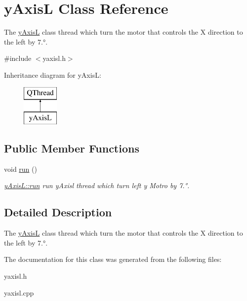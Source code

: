 \hypertarget{classy_axis_l}{}\section{y\+AxisL Class Reference}
\label{classy_axis_l}


The \mbox{\hyperlink{classy_axis_l}{y\+AxisL}} class thread which turn the motor that controls the X direction to the left by 7.°.  




{\ttfamily \#include $<$yaxisl.\+h$>$}

Inheritance diagram for y\+AxisL\+:\begin{figure}[H]
\begin{center}
\leavevmode
\includegraphics[height=2.000000cm]{classy_axis_l}
\end{center}
\end{figure}
\subsection*{Public Member Functions}
\begin{DoxyCompactItemize}
\item 
\mbox{\label{classy_axis_l_a9933821f630d3abc7614ec252b53d592}} 
void \mbox{\hyperlink{classy_axis_l_a9933821f630d3abc7614ec252b53d592}{run}} ()
\begin{DoxyCompactList}\small\item\em \mbox{\hyperlink{classy_axis_l_a9933821f630d3abc7614ec252b53d592}{y\+Axis\+L\+::run}} run y\+Axisl thread which turn left y Motro by 7.°. \end{DoxyCompactList}\end{DoxyCompactItemize}


\subsection{Detailed Description}
The \mbox{\hyperlink{classy_axis_l}{y\+AxisL}} class thread which turn the motor that controls the X direction to the left by 7.°. 

The documentation for this class was generated from the following files\+:\begin{DoxyCompactItemize}
\item 
yaxisl.\+h\item 
yaxisl.\+cpp\end{DoxyCompactItemize}
